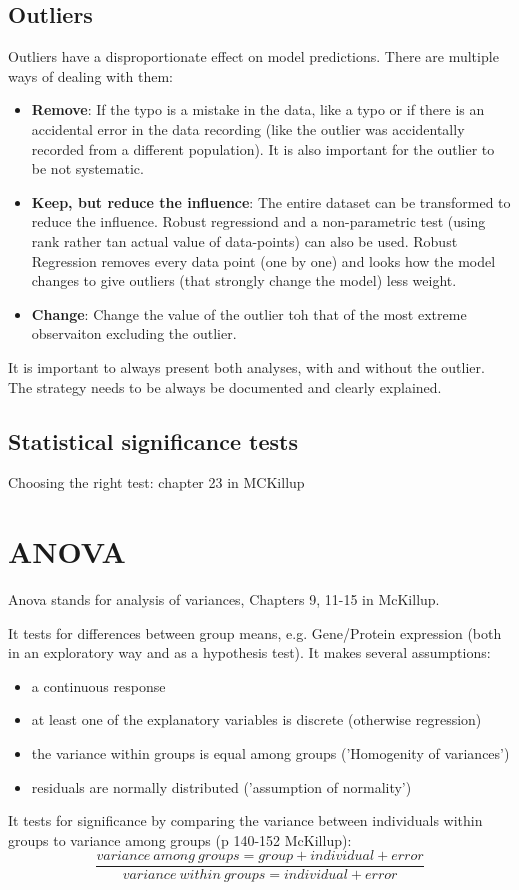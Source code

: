 \documentclass{article}
\begin{document}
\subsection{Outliers}
Outliers have a disproportionate effect on model predictions. There are multiple ways of dealing with them:
\begin{itemize}
    \item \textbf{Remove}: If the typo is a mistake in the data, like a typo or if there is an accidental error in the data recording (like the outlier was accidentally recorded from a different population). It is also important for the outlier to be not systematic.
    \item \textbf{Keep, but reduce the influence}: The entire dataset can be transformed to reduce the influence. Robust regressiond and a non-parametric test (using rank rather tan actual value of data-points) can also be used. Robust Regression removes every data point (one by one) and looks how the model changes to give outliers (that strongly change the model) less weight.
    \item \textbf{Change}: Change the value of the outlier toh that of the most extreme observaiton excluding the outlier.
\end{itemize}
It is important to always present both analyses, with and without the outlier. The strategy needs to be always be documented and clearly explained.

\subsection{Statistical significance tests}
Choosing the right test: chapter 23 in MCKillup


\section{ANOVA}
Anova stands for analysis of variances, Chapters 9, 11-15 in McKillup.\par 
It tests for differences between group means, e.g. Gene/Protein expression (both in an exploratory way and as a hypothesis test). It makes several assumptions:
\begin{itemize}
    \item a continuous response
    \item at least one of the explanatory variables is discrete (otherwise regression)
    \item the variance within groups is equal among groups ('Homogenity of variances')
    \item residuals are normally distributed ('assumption of normality')
\end{itemize}
It tests for significance by comparing the variance between individuals within groups to variance among groups (p 140-152 McKillup):
\begin{equation}\label{fvalue}
   \frac{variance \: among \: groups = group+individual+error}{variance\: within\: groups = individual+error}
\end{equation}
\end{document}
